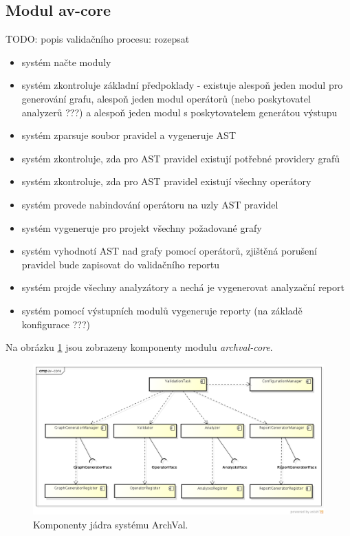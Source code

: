 \subsection{Modul av-core}
TODO: popis validačního procesu: rozepsat
\begin{itemize}
\item systém načte moduly
\item systém zkontroluje základní předpoklady - existuje alespoň jeden modul pro generování grafu, alespoň jeden modul operátorů (nebo poskytovatel analyzerů ???) a alespoň jeden modul s poskytovatelem generátou výstupu
\item systém zparsuje soubor pravidel a vygeneruje AST
\item systém zkontroluje, zda pro AST pravidel existují potřebné providery grafů
\item systém zkontroluje, zda pro AST pravidel existují všechny operátory
\item systém provede nabindování operátoru na uzly AST pravidel
\item systém vygeneruje pro projekt všechny požadované grafy
\item systém vyhodnotí AST nad grafy pomocí operátorů, zjištěná porušení pravidel bude zapisovat do validačního reportu
\item systém projde všechny analyzátory a nechá je vygenerovat analyzační report
\item systém pomocí výstupních modulů vygeneruje reporty (na základě konfigurace ???)
\end{itemize}

Na obrázku \ref{design-archval_core} jsou zobrazeny komponenty modulu \emph{archval-core}.

\begin{figure}[h!]
  \centering
  \includegraphics[width=1.0\textwidth]{./uml/archval_core_cmp.png}
  \caption{Komponenty jádra systému ArchVal.\label{design-archval_core}}
\end{figure}

